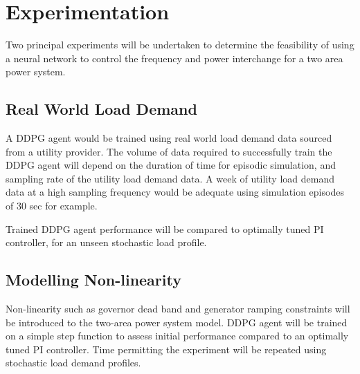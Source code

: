 \section{Experimentation}
Two principal experiments will be undertaken to determine the feasibility of using a neural network to control the frequency and power interchange for a two area power system.


\subsection{Real World Load Demand}
A DDPG agent would be trained using real world load demand data sourced from a utility provider. The volume of data required to successfully train the DDPG agent will depend on the duration of time for episodic simulation, and sampling rate of the utility load demand data. A week of utility load demand data at a high sampling frequency would be adequate using simulation episodes of 30 sec for example.

Trained DDPG agent performance will be compared to optimally tuned PI controller, for an unseen stochastic load profile.



\subsection{Modelling Non-linearity}
Non-linearity such as governor dead band and generator ramping constraints will be introduced to the two-area power system model. DDPG agent will be trained on a simple step function to assess initial performance compared to an optimally tuned PI controller. Time permitting the experiment will be repeated using stochastic load demand profiles.
